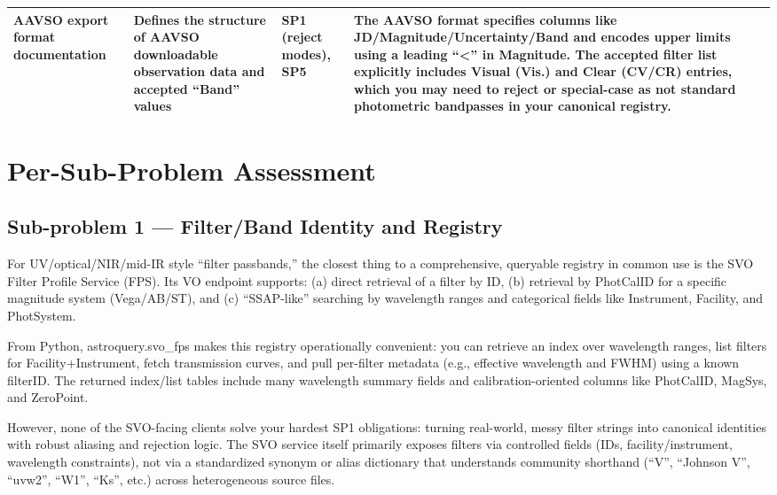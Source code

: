 \documentclass[twocolumn]{aastex701}
\begin{document}
\begin{longtable}{p{3cm} p{3cm} p{3cm} p{5cm}}
AAVSO export format documentation &
Defines the structure of AAVSO downloadable observation data and accepted “Band” values &
SP1 (reject modes), SP5 &
The AAVSO format specifies columns like JD/Magnitude/Uncertainty/Band and encodes upper limits using a leading “<” in Magnitude. The accepted filter list explicitly includes Visual (Vis.) and Clear (CV/CR) entries, which you may need to reject or special-case as not standard photometric bandpasses in your canonical registry. \citep{ref13} \\

\hline
\end{longtable}
\section{Per-Sub-Problem Assessment}

\subsection{Sub-problem 1 — Filter/Band Identity and Registry}

For UV/optical/NIR/mid-IR style “filter passbands,” the closest thing to a comprehensive, queryable registry in common use is the SVO Filter Profile Service (FPS). Its VO endpoint supports: (a) direct retrieval of a filter by ID, (b) retrieval by PhotCalID for a specific magnitude system (Vega/AB/ST), and (c) “SSAP-like” searching by wavelength ranges and categorical fields like Instrument, Facility, and PhotSystem. \citep{ref14}

From Python, astroquery.svo\_fps makes this registry operationally convenient: you can retrieve an index over wavelength ranges, list filters for Facility+Instrument, fetch transmission curves, and pull per-filter metadata (e.g., effective wavelength and FWHM) using a known filterID. The returned index/list tables include many wavelength summary fields and calibration-oriented columns like PhotCalID, MagSys, and ZeroPoint. \citep{ref15}

However, none of the SVO-facing clients solve your hardest SP1 obligations: turning real-world, messy filter strings into canonical identities with robust aliasing and rejection logic. The SVO service itself primarily exposes filters via controlled fields (IDs, facility/instrument, wavelength constraints), not via a standardized synonym or alias dictionary that understands community shorthand (“V”, “Johnson V”, “uvw2”, “W1”, “Ks”, etc.) across heterogeneous source files. \citep{ref16}
\end{document}
